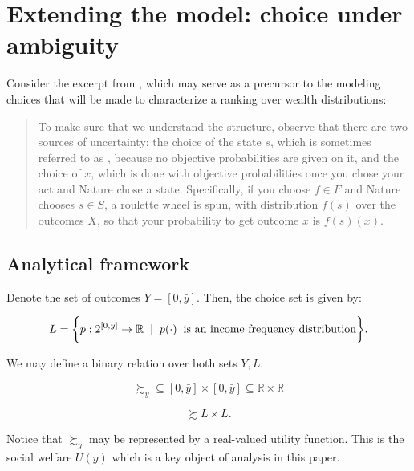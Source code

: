 \documentclass[\econtexRoot/IneqMeas]{subfiles}
\begin{document}
\onlyinsubfile{\setcounter{section}{3}}
\section{Extending the model: choice under ambiguity}
\notinsubfile{\label{sec:ExtendedModel}}

\par Consider the excerpt from \cite{g09}, which may serve as a precursor to the modeling choices that will be made to characterize a ranking over wealth distributions:

\begin{quote}


To make sure that we understand the structure, observe that there are two sources of uncertainty: the choice of the state $s$, which is sometimes referred to as , because no objective probabilities are given on it, and the choice of $x$, which is done with objective probabilities once you chose your act and Nature chose a state. Specifically, if you choose $f \in F$ and Nature chooses $s \in S$, a roulette wheel is spun, with distribution $f(s)$ over the outcomes $X$, so that your probability to get outcome $x$ is $f(s)(x)$.

\end{quote}

\subsection{Analytical framework}

\par Denote the set of outcomes $Y = [0,\bar{y}]$. Then, the choice set is given by:

$$ L = \bigg\{ p: 2^{[0,\bar{y}]} \to \mathbb{R} \hspace{2mm} | \hspace{2mm} p(\cdot) \hspace{2mm} \text{is an income frequency distribution}  \bigg\}. $$

\par We may define a binary relation over both sets $Y,L:$

$$ \succsim_{y} \subseteq [0,\bar{y}] \times [0,\bar{y}] \subseteq \mathbb{R} \times \mathbb{R} $$

$$ \succsim L \times L. $$

\par Notice that $\succsim_y$ may be represented by a real-valued utility function. This is the social welfare $U(y)$ which is a key object of analysis in this paper. 
\end{document}
